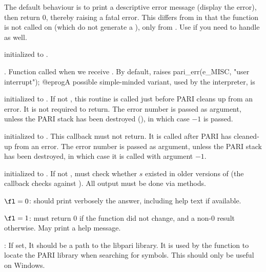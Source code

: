 The default behaviour is to print a descriptive error
message (display the error), then return 0, thereby raising a fatal error.
This differs from  in that the
function is not called on  (which do not generate a ),
only from . Use  if you need to handle
 as well.

initialized to .

.
Function called when we receive . By default, raises
\bprog
  pari_err(e_MISC, "user interrupt");
@eprog\noindent A possible simple-minded variant, used by the
 interpreter, is


initialized to . If not , this routine is called just
before PARI cleans up from an error. It is not required to return.  The error
number is passed as argument, unless the PARI stack has been destroyed
(), in which case $-1$ is passed.

initialized to . This callback must not return.
It is called after PARI has cleaned-up from an error. The error number is
passed as argument, unless the PARI stack has been destroyed, in which case
it is called with argument $-1$.

 initialized to . If not , must check whether $s$
existed in older versions of  (the  callback checks against
). All output must be done via  methods.

\item $\fl = 0$: should print verbosely the answer, including help text if
available.

\item $\fl = 1$: must return $0$ if the function did not change, and a
non-$0$ result otherwise. May print a help message.


: If set, It should be a path to the libpari library.
It is used by the function  to locate the PARI library when
searching for symbols.  This should only be useful on Windows.

